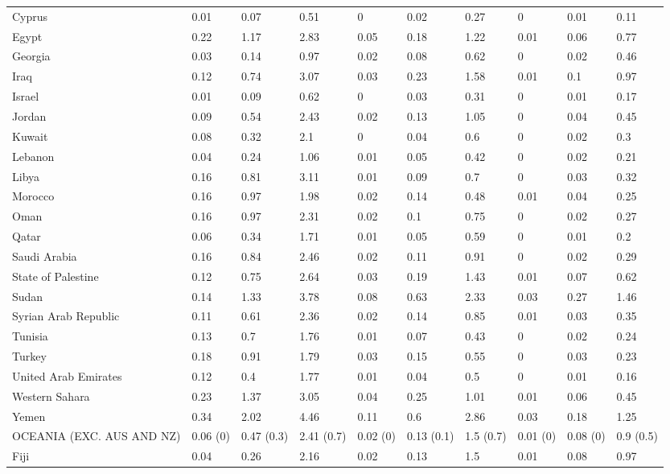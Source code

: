 \begin{longtable}[t]{llllllllll}
Cyprus & 0.01 & 0.07 & 0.51 & 0 & 0.02 & 0.27 & 0 & 0.01 & 0.11\\
Egypt & 0.22 & 1.17 & 2.83 & 0.05 & 0.18 & 1.22 & 0.01 & 0.06 & 0.77\\
Georgia & 0.03 & 0.14 & 0.97 & 0.02 & 0.08 & 0.62 & 0 & 0.02 & 0.46\\
Iraq & 0.12 & 0.74 & 3.07 & 0.03 & 0.23 & 1.58 & 0.01 & 0.1 & 0.97\\
Israel & 0.01 & 0.09 & 0.62 & 0 & 0.03 & 0.31 & 0 & 0.01 & 0.17\\
Jordan & 0.09 & 0.54 & 2.43 & 0.02 & 0.13 & 1.05 & 0 & 0.04 & 0.45\\
Kuwait & 0.08 & 0.32 & 2.1 & 0 & 0.04 & 0.6 & 0 & 0.02 & 0.3\\
Lebanon & 0.04 & 0.24 & 1.06 & 0.01 & 0.05 & 0.42 & 0 & 0.02 & 0.21\\
Libya & 0.16 & 0.81 & 3.11 & 0.01 & 0.09 & 0.7 & 0 & 0.03 & 0.32\\
Morocco & 0.16 & 0.97 & 1.98 & 0.02 & 0.14 & 0.48 & 0.01 & 0.04 & 0.25\\
Oman & 0.16 & 0.97 & 2.31 & 0.02 & 0.1 & 0.75 & 0 & 0.02 & 0.27\\
Qatar & 0.06 & 0.34 & 1.71 & 0.01 & 0.05 & 0.59 & 0 & 0.01 & 0.2\\
Saudi Arabia & 0.16 & 0.84 & 2.46 & 0.02 & 0.11 & 0.91 & 0 & 0.02 & 0.29\\
State of Palestine & 0.12 & 0.75 & 2.64 & 0.03 & 0.19 & 1.43 & 0.01 & 0.07 & 0.62\\
Sudan & 0.14 & 1.33 & 3.78 & 0.08 & 0.63 & 2.33 & 0.03 & 0.27 & 1.46\\
Syrian Arab Republic & 0.11 & 0.61 & 2.36 & 0.02 & 0.14 & 0.85 & 0.01 & 0.03 & 0.35\\
Tunisia & 0.13 & 0.7 & 1.76 & 0.01 & 0.07 & 0.43 & 0 & 0.02 & 0.24\\
Turkey & 0.18 & 0.91 & 1.79 & 0.03 & 0.15 & 0.55 & 0 & 0.03 & 0.23\\
United Arab Emirates & 0.12 & 0.4 & 1.77 & 0.01 & 0.04 & 0.5 & 0 & 0.01 & 0.16\\
Western Sahara & 0.23 & 1.37 & 3.05 & 0.04 & 0.25 & 1.01 & 0.01 & 0.06 & 0.45\\
Yemen & 0.34 & 2.02 & 4.46 & 0.11 & 0.6 & 2.86 & 0.03 & 0.18 & 1.25\\
OCEANIA (EXC. AUS AND NZ) & 0.06 (0) & 0.47 (0.3) & 2.41 (0.7) & 0.02 (0) & 0.13 (0.1) & 1.5 (0.7) & 0.01 (0) & 0.08 (0) & 0.9 (0.5)\\
Fiji & 0.04 & 0.26 & 2.16 & 0.02 & 0.13 & 1.5 & 0.01 & 0.08 & 0.97\\

\end{longtable}
